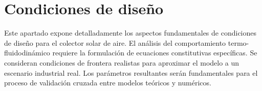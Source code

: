 \section{Condiciones de diseño}
\label{sec:cap04_condiciones_diseno}

Este apartado expone detalladamente los aspectos fundamentales de condiciones de diseño para el colector solar de aire.
El análisis del comportamiento termo-fluidodinámico requiere la formulación de ecuaciones constitutivas específicas.
Se consideran condiciones de frontera realistas para aproximar el modelo a un escenario industrial real.
Los parámetros resultantes serán fundamentales para el proceso de validación cruzada entre modelos teóricos y numéricos.
